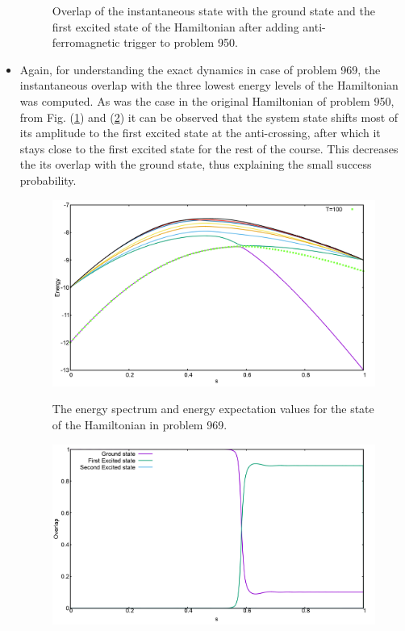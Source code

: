 \documentclass[../main.tex]{subfiles}
\begin{document}
\begin{itemize}
\begin{figure}[H]
\caption{Overlap of the instantaneous state with the ground state and the first excited state of the Hamiltonian after adding anti-ferromagnetic trigger to problem 950.}
\end{figure}

\item Again, for understanding the exact dynamics in case of problem 969, the instantaneous overlap with the three lowest energy levels of the Hamiltonian was computed. As was the case in the original Hamiltonian of problem 950, from Fig. (\ref{fig:a47}) and (\ref{fig:a48}) it can be observed that the system state shifts most of its amplitude to the first excited state at the anti-crossing, after which it stays close to the first excited state for the rest of the course. This decreases the its overlap with the ground state, thus explaining the small success probability.
\begin{figure}[H]
\centering
  \includegraphics[scale=0.24]{969_O_T100.png}
  \label{fig:a47}
  \caption{The energy spectrum and energy expectation values for the state of the Hamiltonian in problem 969.}
 \end{figure}

\begin{figure}[H]
  \centering
  \includegraphics[scale=0.24]{969_Overlap_Orig.png}
  \label{fig:a48}


\end{figure}
\end{itemize}
\end{document}
